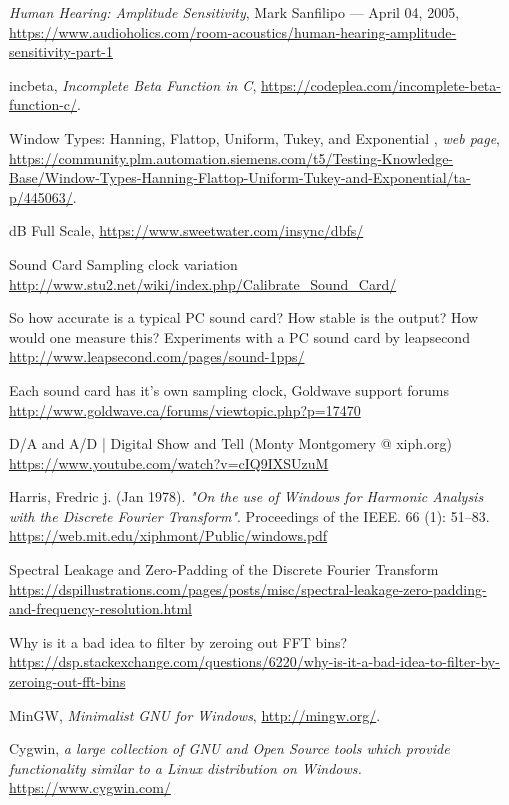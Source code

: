 \documentclass[10pt,a4paper]{report}
\begin{document}
\begin{thebibliography}{9}
	\textit{Human Hearing: Amplitude Sensitivity}, 
	Mark Sanfilipo — April 04, 2005,
	\url{https://www.audioholics.com/room-acoustics/human-hearing-amplitude-sensitivity-part-1}
	
	incbeta, 
	\textit{Incomplete Beta Function in C},
	\url{https://codeplea.com/incomplete-beta-function-c/}.
	
	Window Types: Hanning, Flattop, Uniform, Tukey, and Exponential ,
	\textit{web page},
	\url{https://community.plm.automation.siemens.com/t5/Testing-Knowledge-Base/Window-Types-Hanning-Flattop-Uniform-Tukey-and-Exponential/ta-p/445063/}.
	
	dB Full Scale, 
	\url{https://www.sweetwater.com/insync/dbfs/}
	
	Sound Card Sampling clock variation
	\url{http://www.stu2.net/wiki/index.php/Calibrate_Sound_Card/}
	
	So how accurate is a typical PC sound card? How stable is the output? How would one measure this?
	Experiments with a PC sound card by leapsecond
	\url{http://www.leapsecond.com/pages/sound-1pps/}
	
	Each sound card has it's own sampling clock, Goldwave support forums
	\url{http://www.goldwave.ca/forums/viewtopic.php?p=17470}
	
	D/A and A/D | Digital Show and Tell (Monty Montgomery @ xiph.org)
	\url{https://www.youtube.com/watch?v=cIQ9IXSUzuM}
	
	Harris, Fredric j. (Jan 1978). \textit{"On the use of Windows for Harmonic Analysis with the Discrete Fourier Transform"}. Proceedings of the IEEE. 66 (1): 51–83.
	\url{https://web.mit.edu/xiphmont/Public/windows.pdf}
	
	Spectral Leakage and Zero-Padding of the Discrete Fourier Transform
	\url{https://dspillustrations.com/pages/posts/misc/spectral-leakage-zero-padding-and-frequency-resolution.html}
	
	Why is it a bad idea to filter by zeroing out FFT bins?
	\url{https://dsp.stackexchange.com/questions/6220/why-is-it-a-bad-idea-to-filter-by-zeroing-out-fft-bins}
	
	MinGW, 
	\textit{Minimalist GNU for Windows},
	\url{http://mingw.org/}.
	
	Cygwin,
	\textit{a large collection of GNU and Open Source tools which provide functionality similar to a Linux distribution on Windows.}
	\url{https://www.cygwin.com/}
	

\end{thebibliography}
\end{document}
